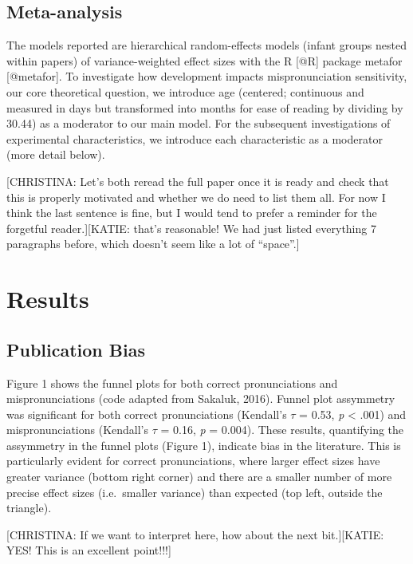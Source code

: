 \documentclass[man]{apa6}
\theoremstyle{definition}
\theoremstyle{definition}
\theoremstyle{definition}
\theoremstyle{remark}
\begin{document}
\subsection{Meta-analysis}\label{meta-analysis}

The models reported are hierarchical random-effects models (infant
groups nested within papers) of variance-weighted effect sizes with the
R {[}@R{]} package metafor {[}@metafor{]}. To investigate how
development impacts mispronunciation sensitivity, our core theoretical
question, we introduce age (centered; continuous and measured in days
but transformed into months for ease of reading by dividing by 30.44) as
a moderator to our main model. For the subsequent investigations of
experimental characteristics, we introduce each characteristic as a
moderator (more detail below).

{[}CHRISTINA: Let's both reread the full paper once it is ready and
check that this is properly motivated and whether we do need to list
them all. For now I think the last sentence is fine, but I would tend to
prefer a reminder for the forgetful reader.{]}{[}KATIE: that's
reasonable! We had just listed everything 7 paragraphs before, which
doesn't seem like a lot of \enquote{space}.{]}

\section{Results}\label{results}

\subsection{Publication Bias}\label{publication-bias-1}

Figure 1 shows the funnel plots for both correct pronunciations and
mispronunciations (code adapted from Sakaluk, 2016). Funnel plot
assymmetry was significant for both correct pronunciations (Kendall's
\(\tau\) = 0.53, \emph{p} \textless{} .001) and mispronunciations
(Kendall's \(\tau\) = 0.16, \emph{p} = 0.004). These results,
quantifying the assymmetry in the funnel plots (Figure 1), indicate bias
in the literature. This is particularly evident for correct
pronunciations, where larger effect sizes have greater variance (bottom
right corner) and there are a smaller number of more precise effect
sizes (i.e.~smaller variance) than expected (top left, outside the
triangle).

{[}CHRISTINA: If we want to interpret here, how about the next
bit.{]}{[}KATIE: YES! This is an excellent point!!!{]}
\end{document}

